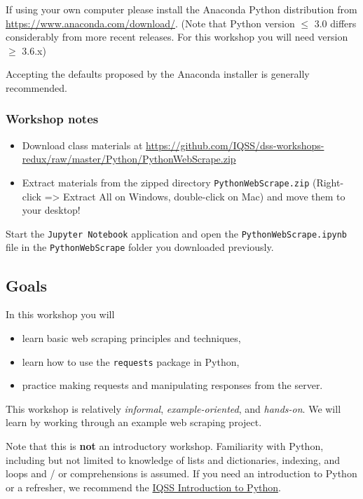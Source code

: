 \documentclass[]{book}
\providecommand{\tightlist}{%
  \setlength{\itemsep}{0pt}\setlength{\parskip}{0pt}}
\begin{document}
If using your own computer please install the Anaconda Python
distribution from \url{https://www.anaconda.com/download/}. (Note that
Python version \(\leq\) 3.0 differs considerably from more recent
releases. For this workshop you will need version \(\geq\) 3.6.x)

Accepting the defaults proposed by the Anaconda installer is generally
recommended.

\subsubsection{Workshop notes}\label{workshop-notes}

\begin{itemize}
\tightlist
\item
  Download class materials at
  \url{https://github.com/IQSS/dss-workshops-redux/raw/master/Python/PythonWebScrape.zip}
\item
  Extract materials from the zipped directory
  \texttt{PythonWebScrape.zip} (Right-click =\textgreater{} Extract All
  on Windows, double-click on Mac) and move them to your desktop!
\end{itemize}

Start the \texttt{Jupyter\ Notebook} application and open the
\texttt{PythonWebScrape.ipynb} file in the \texttt{PythonWebScrape}
folder you downloaded previously.

\subsection{Goals}\label{goals-4}

In this workshop you will

\begin{itemize}
\tightlist
\item
  learn basic web scraping principles and techniques,
\item
  learn how to use the \texttt{requests} package in Python,
\item
  practice making requests and manipulating responses from the server.
\end{itemize}

This workshop is relatively \emph{informal}, \emph{example-oriented},
and \emph{hands-on}. We will learn by working through an example web
scraping project.

Note that this is \textbf{not} an introductory workshop. Familiarity
with Python, including but not limited to knowledge of lists and
dictionaries, indexing, and loops and / or comprehensions is assumed. If
you need an introduction to Python or a refresher, we recommend the
\href{https://dss.iq.harvard.edu/workshop-materials\#widget-0}{IQSS
Introduction to Python}.
\end{document}
